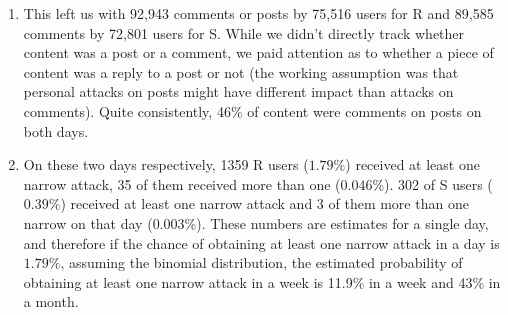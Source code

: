 \documentclass[10pt,]{scrartcl}
\newenvironment{Shaded}{\begin{snugshade}}{\end{snugshade}}
\newcommand{\KeywordTok}[1]{\textcolor[rgb]{0.13,0.29,0.53}{\textbf{#1}}}
\newcommand{\DataTypeTok}[1]{\textcolor[rgb]{0.13,0.29,0.53}{#1}}
\newcommand{\StringTok}[1]{\textcolor[rgb]{0.31,0.60,0.02}{#1}}
\newcommand{\OtherTok}[1]{\textcolor[rgb]{0.56,0.35,0.01}{#1}}
\newcommand{\OperatorTok}[1]{\textcolor[rgb]{0.81,0.36,0.00}{\textbf{#1}}}
\newcommand{\NormalTok}[1]{#1}
\begin{document}
\scriptsize

\begin{Shaded}
\end{Shaded}

\normalsize

\begin{enumerate}
\def\labelenumi{\arabic{enumi}.}
\setcounter{enumi}{4}
\item
  This left us with 92,943 comments or posts by 75,516 users for
  \textsf{R} and 89,585 comments by 72,801 users for \textsf{S}. While
  we didn't directly track whether content was a post or a comment, we
  paid attention as to whether a piece of content was a reply to a post
  or not (the working assumption was that personal attacks on posts
  might have different impact than attacks on comments). Quite
  consistently, 46\% of content were comments on posts on both days.
\item
  On these two days respectively, 1359 \textsf{R} users (\(1.79\%\))
  received at least one \textsf{narrow} attack, 35 of them received more
  than one (\(0.046\%\)). 302 of \textsf{S} users (\(0.39\%\)) received
  at least one \textsf{narrow} attack and 3 of them more than one
  \textsf{narrow} on that day (\(0.003\%\)). These numbers are estimates
  for a single day, and therefore if the chance of obtaining at least
  one \textsf{narrow} attack in a day is \(1.79\%\), assuming the
  binomial distribution, the estimated probability of obtaining at least
  one \textsf{narrow} attack in a week is 11.9\% in a week and 43\% in a
  month.
\end{enumerate}
\end{document}

